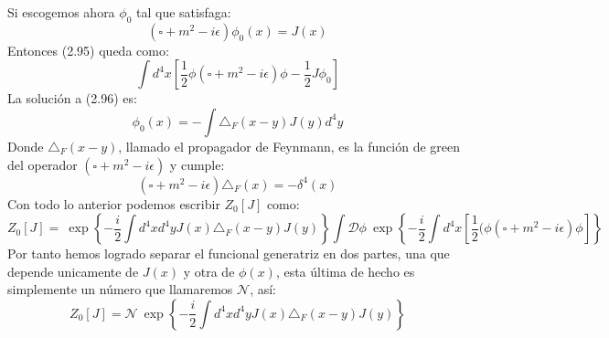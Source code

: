 Si escogemos ahora $\phi_0$ tal que satisfaga:
\begin{equation}
(\square+m^2-i\epsilon)\phi_0(x)=J(x)
\end{equation}
Entonces (2.95) queda como:
\begin{equation}
\int d^{4}x\left[\frac{1}{2}\phi(\square+m^{2}-i\epsilon)\phi-\frac{1}{2}J\phi_{0}\right]
\end{equation}
La solución a (2.96) es:
\begin{equation}
\phi_{0}(x)=-\int\triangle_{F}(x-y)J(y)d^{4}y
\end{equation}
Donde $\triangle_F(x-y)$, llamado el propagador de Feynmann, es la función de green del operador $(\square+m^2-i\epsilon)$ y cumple:
\begin{equation}
(\square+m^2-i\epsilon)\triangle_{F}(x)=-\delta^4(x)
\end{equation}
Con todo lo anterior podemos escribir $Z_0[J]$ como:
\begin{equation}
Z_0[J]=\ \exp\left\{ -\frac{i}{2}\int d^{4}xd^{4}yJ(x)\triangle_{F}(x-y)J(y)\right\} \int\mathcal{D}\phi\ \exp\left\{ -\frac{i}{2}\int d^{4}x\left[\frac{1}{2}(\phi(\square +m^{2}-i\epsilon)\phi\right]\right\} 
\end{equation}
Por tanto hemos logrado separar el funcional generatriz en dos partes, una que depende unicamente de $J(x)$ y otra de $\phi(x)$, esta última de hecho es simplemente un número que llamaremos $\mathcal{N}$, así:
\begin{equation}
Z_{0}[J]=\mathcal{N}\ \exp\left\{ -\frac{i}{2}\int d^{4}xd^{4}yJ(x)\triangle_{F}(x-y)J(y)\right\}
\end{equation}
